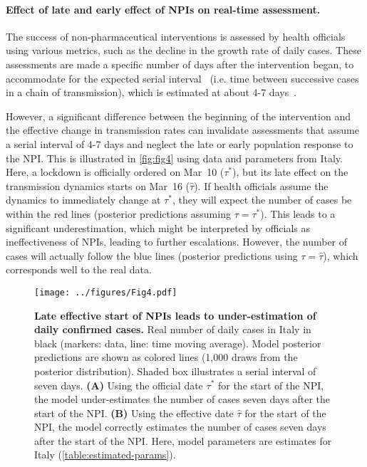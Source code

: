 \documentclass[12pt]{extarticle}
\begin{document}
\paragraph*{Effect of late and early effect of NPIs on real-time assessment.}

The success of non-pharmaceutical interventions is assessed by health officials using various metrics, such as the decline in the growth rate of daily cases. These assessments are made a specific number of days after the intervention began, to accommodate for the expected serial interval~\citep{Banholzer2020} (i.e. time between successive cases in a chain of transmission), which is estimated at about 4-7 days~\citep{Gatto2020}. %

However, a significant difference between the beginning of the intervention and the effective change in transmission rates can invalidate assessments that assume a serial interval of 4-7 days and neglect the late or early population response to the NPI.
This is illustrated in \autoref{fig:fig4} using data and parameters from Italy.
Here, a lockdown is officially ordered on Mar~10 ($\tau^*$), but its late effect on the transmission dynamics starts on Mar~16 ($\hat{\tau}$). If health officials assume the dynamics to immediately change at $\tau^*$, they will expect the number of cases be within the red lines (posterior predictions assuming $\tau=\tau^*$).
This leads to a significant underestimation, which might be interpreted by officials as ineffectiveness of NPIs, leading to further escalations.
However, the number of cases will actually follow the blue lines (posterior predictions using $\tau=\hat{\tau}$), which corresponds well to the real data.


\begin{figure}[h]
    \centering
	\texttt{[image: ../figures/Fig4.pdf]}
    \caption{
    \textbf{Late effective start of NPIs leads to under-estimation of daily confirmed cases.}
    Real number of daily cases in Italy in black (markers: data, line: time moving average). 
    Model posterior predictions are shown as colored lines (1,000 draws from the posterior distribution). 
    Shaded box illustrates a serial interval of seven days.
    \textbf{(A)} Using the official date $\tau^*$ for the start of the NPI,  the model under-estimates the number of cases seven days after the start of the NPI.
    \textbf{(B)} Using the effective date $\hat{\tau}$ for the start of the NPI,  the model correctly estimates the number of cases seven days after the start of the NPI.
    Here, model parameters are estimates for Italy (\autoref{table:estimated-params}).
    } 
    \label{fig:fig4}
\end{figure}
\end{document}
